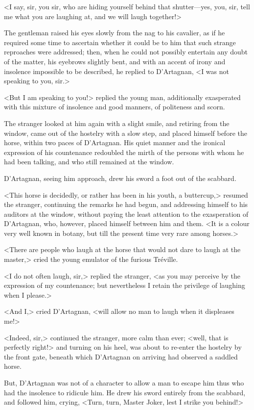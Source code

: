 <I say, sir, you sir, who are hiding yourself behind that shutter—yes, you, sir, tell me what you are laughing at, and we will laugh together!> 

The gentleman raised his eyes slowly from the nag to his cavalier, as if he required some time to ascertain whether it could be to him that such strange reproaches were addressed; then, when he could not possibly entertain any doubt of the matter, his eyebrows slightly bent, and with an accent of irony and insolence impossible to be described, he replied to D'Artagnan, <I was not speaking to you, sir.> 

<But I am speaking to you!> replied the young man, additionally exasperated with this mixture of insolence and good manners, of politeness and scorn. 

The stranger looked at him again with a slight smile, and retiring from the window, came out of the hostelry with a slow step, and placed himself before the horse, within two paces of D'Artagnan. His quiet manner and the ironical expression of his countenance redoubled the mirth of the persons with whom he had been talking, and who still remained at the window. 

D'Artagnan, seeing him approach, drew his sword a foot out of the scabbard. 

<This horse is decidedly, or rather has been in his youth, a buttercup,> resumed the stranger, continuing the remarks he had begun, and addressing himself to his auditors at the window, without paying the least attention to the exasperation of D'Artagnan, who, however, placed himself between him and them. <It is a colour very well known in botany, but till the present time very rare among horses.> 

<There are people who laugh at the horse that would not dare to laugh at the master,> cried the young emulator of the furious Tréville. 

<I do not often laugh, sir,> replied the stranger, <as you may perceive by the expression of my countenance; but nevertheless I retain the privilege of laughing when I please.> 

<And I,> cried D'Artagnan, <will allow no man to laugh when it displeases me!> 

<Indeed, sir,> continued the stranger, more calm than ever; <well, that is perfectly right!> and turning on his heel, was about to re-enter the hostelry by the front gate, beneath which D'Artagnan on arriving had observed a saddled horse. 

But, D'Artagnan was not of a character to allow a man to escape him thus who had the insolence to ridicule him. He drew his sword entirely from the scabbard, and followed him, crying, <Turn, turn, Master Joker, lest I strike you behind!> 


